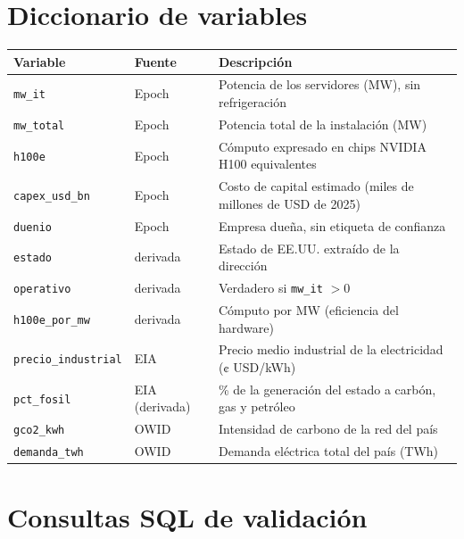 \documentclass[11pt,a4paper]{article}
\begin{document}
\appendix
\section{Diccionario de variables}

\begin{table}[h]
\centering\small
\begin{tabularx}{\textwidth}{@{}l l X@{}}
\toprule
\textbf{Variable} & \textbf{Fuente} & \textbf{Descripción} \\
\midrule
\texttt{mw\_it} & Epoch & Potencia de los servidores (MW), sin refrigeración \\
\texttt{mw\_total} & Epoch & Potencia total de la instalación (MW) \\
\texttt{h100e} & Epoch & Cómputo expresado en chips NVIDIA H100 equivalentes \\
\texttt{capex\_usd\_bn} & Epoch & Costo de capital estimado (miles de millones de USD de 2025) \\
\texttt{duenio} & Epoch & Empresa dueña, sin etiqueta de confianza \\
\texttt{estado} & derivada & Estado de EE.UU. extraído de la dirección \\
\texttt{operativo} & derivada & Verdadero si \texttt{mw\_it} $>0$ \\
\texttt{h100e\_por\_mw} & derivada & Cómputo por MW (eficiencia del hardware) \\
\texttt{precio\_industrial} & EIA & Precio medio industrial de la electricidad (¢ USD/kWh) \\
\texttt{pct\_fosil} & EIA (derivada) & \% de la generación del estado a carbón, gas y petróleo \\
\texttt{gco2\_kwh} & OWID & Intensidad de carbono de la red del país \\
\texttt{demanda\_twh} & OWID & Demanda eléctrica total del país (TWh) \\
\bottomrule
\end{tabularx}
\end{table}

\section{Consultas SQL de validación}
\end{document}
